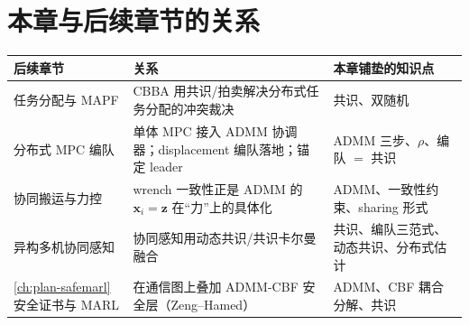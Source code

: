 \section*{本章与后续章节的关系}
\begin{table}[H]\centering\small
\begin{tabular}{p{3.2cm}p{6.4cm}p{4.0cm}}
\toprule
后续章节 & 关系 & 本章铺垫的知识点 \\
\midrule
任务分配与 MAPF & CBBA 用共识/拍卖解决分布式任务分配的冲突裁决 & 共识、双随机 \\
分布式 MPC 编队 & 单体 MPC 接入 ADMM 协调器；displacement 编队落地；锚定 leader & ADMM 三步、$\rho$、编队 $=$ 共识 \\
协同搬运与力控 & wrench 一致性正是 ADMM 的 $\mathbf{x}_i=\mathbf{z}$ 在“力”上的具体化 & ADMM、一致性约束、sharing 形式 \\
异构多机协同感知 & 协同感知用动态共识/共识卡尔曼融合 & 共识、编队三范式、动态共识、分布式估计 \\
\cref{ch:plan-safemarl} 安全证书与 MARL & 在通信图上叠加 ADMM-CBF 安全层（Zeng--Hamed） & ADMM、CBF 耦合分解、共识 \\
\bottomrule
\end{tabular}
\end{table}

